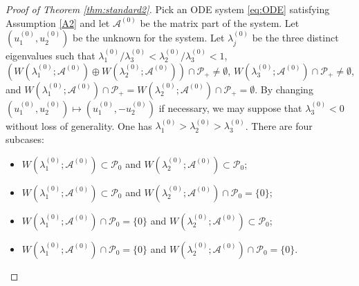 \documentclass[11pt,a4paper,twosides]{amsart}
\theoremstyle{plain}
\theoremstyle{remark}
\numberwithin{equation}{section}
\newcommand{\R}{\mathbb{R}}
\theoremstyle{definition}
\newcommand{\1}{{\bf 1}_{\{|x| < |t|\}}}
\begin{document}
\begin{proof}[Proof of Theorem \ref{thm:standard2}]
Pick an ODE system \eqref{eq:ODE} satisfying Assumption \ref{A2} and let
$\mathscr{A}^{(0)}$ be the matrix part of the system.
Let $(u_1^{(0)},u_2^{(0)})$ be the unknown for the system. 
Let $\lambda_j^{(0)}$ be the three distinct eigenvalues such that
${\lambda_1^{(0)}}/{\lambda_3^{(0)}}<
{\lambda_2^{(0)}}/{\lambda_3^{(0)}}<1$,
$(W(\lambda_1^{(0)};\mathscr{A}^{(0)}) \oplus W(\lambda_2^{(0)};\mathscr{A}^{(0)})) \cap \mathcal{P}_+ \neq \emptyset$,
$W(\lambda_3^{(0)};\mathscr{A}^{(0)} )\cap \mathcal{P}_+ \neq \emptyset$,
and $W(\lambda_1^{(0)};\mathscr{A}^{(0)})\cap \mathcal{P}_+=W(\lambda_2^{(0)};\mathscr{A}^{(0)})\cap \mathcal{P}_+=\emptyset$.
By changing $(u_1^{(0)},u_2^{(0)})\mapsto (u_1^{(0)},-u_2^{(0)})$ if necessary, we may suppose that $\lambda_3^{(0)}<0$ without loss of generality.
One has ${\lambda_1^{(0)}}>
{\lambda_2^{(0)}}>\lambda_3^{(0)}$.
There are four subcases:
\begin{itemize}
\item[(a)] $W(\lambda_1^{(0)};\mathscr{A}^{(0)}) \subset  \mathcal{P}_0$ and $W(\lambda_2^{(0)};\mathscr{A}^{(0)}) \subset  \mathcal{P}_0$;
\item[(b)] $W(\lambda_1^{(0)};\mathscr{A}^{(0)}) \subset \mathcal{P}_0$ and $W(\lambda_2^{(0)};\mathscr{A}^{(0)}) \cap \mathcal{P}_0 = \{0\}$;
\item[(c)] $W(\lambda_1^{(0)};\mathscr{A}^{(0)}) \cap \mathcal{P}_0 = \{0\}$ and
$W(\lambda_2^{(0)};\mathscr{A}^{(0)}) \subset \mathcal{P}_0$;
\item[(d)]
$W(\lambda_1^{(0)};\mathscr{A}^{(0)}) \cap \mathcal{P}_0 = \{0\}$ and $W(\lambda_2^{(0)};\mathscr{A}^{(0)}) \cap \mathcal{P}_0 = \{0\}$.
\end{itemize}



\end{proof}
\end{document}
